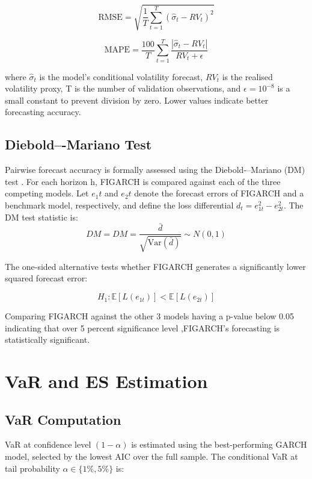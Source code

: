 \begin{equation}
\label{RMSE}
\text{RMSE}
=
\sqrt{
\frac{1}{T}
\sum_{t=1}^{T}
\left(
\hat{\sigma}_t - RV_t
\right)^2
}
\end{equation}

\begin{equation}
\label{MAPE}
\text{MAPE}
=
\frac{100}{T}
\sum_{t=1}^{T}
\frac{
\left|
\hat{\sigma}_t - RV_t
\right|
}{
RV_t + \epsilon
}
\end{equation}

where $\hat{\sigma}_t$  is the model’s conditional volatility forecast, $RV_t$ is the realised volatility proxy,
T is the number of validation observations, and $\epsilon = 10^{-8}$ is a small constant to prevent
division by zero. Lower values indicate better forecasting accuracy.

\subsection{Diebold–-Mariano Test}
Pairwise forecast accuracy is formally assessed using the Diebold-–Mariano (DM) test \citep{Diebold1995}. For each horizon h, FIGARCH is compared against each of the three competing models. Let $e_1t$ and 
$e_2t$ denote the forecast errors of FIGARCH and a benchmark model, respectively, and define the loss differential $
d_t = e_{1t}^2 - e_{2t}^2
$. The DM test statistic is:
\begin{equation}
\label{DM TEST}
DM
=
DM
=
\frac{\bar{d}}
{\sqrt{\mathrm{Var}(\bar{d})}}
\sim N(0,1) 
\end{equation}

The one-sided alternative tests whether FIGARCH generates a significantly lower squared
forecast error:

\begin{equation}
H_1 : \mathbb{E}[L(e_{1t})] < \mathbb{E}[L(e_{2t})]
\end{equation}

Comparing FIGARCH against the other 3 models having a p-value below 0.05 indicating that over 5 percent significance level ,FIGARCH’s forecasting is statistically
significant.

\section{VaR and ES Estimation}
\subsection{VaR Computation}
VaR at confidence level $(1 - \alpha)$ is estimated using the best-performing GARCH
model, selected by the lowest AIC over the full sample. The conditional VaR at tail
probability $\alpha \in \{1\%, 5\%\}$ is:


